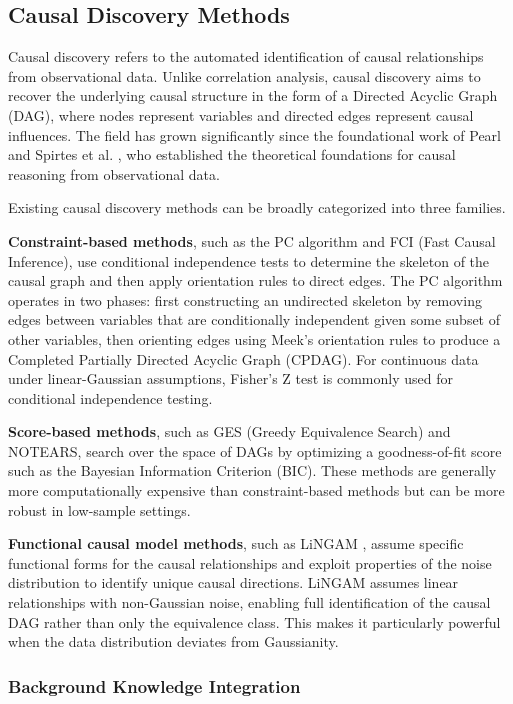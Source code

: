 \documentclass[a4paper,11pt,oneside]{article}
\begin{document}
\subsection{Causal Discovery Methods}

Causal discovery refers to the automated identification of causal relationships from observational data. Unlike correlation analysis, causal discovery aims to recover the underlying causal structure in the form of a Directed Acyclic Graph (DAG), where nodes represent variables and directed edges represent causal influences. The field has grown significantly since the foundational work of Pearl \cite{pearl2000} and Spirtes et al. \cite{spirtes2000}, who established the theoretical foundations for causal reasoning from observational data.

Existing causal discovery methods can be broadly categorized into three families.

\textbf{Constraint-based methods}, such as the PC algorithm \cite{spirtes2000} and FCI (Fast Causal Inference), use conditional independence tests to determine the skeleton of the causal graph and then apply orientation rules to direct edges. The PC algorithm operates in two phases: first constructing an undirected skeleton by removing edges between variables that are conditionally independent given some subset of other variables, then orienting edges using Meek's orientation rules to produce a Completed Partially Directed Acyclic Graph (CPDAG). For continuous data under linear-Gaussian assumptions, Fisher's Z test is commonly used for conditional independence testing.

\textbf{Score-based methods}, such as GES (Greedy Equivalence Search) \cite{hauser2012} and NOTEARS, search over the space of DAGs by optimizing a goodness-of-fit score such as the Bayesian Information Criterion (BIC). These methods are generally more computationally expensive than constraint-based methods but can be more robust in low-sample settings.

\textbf{Functional causal model methods}, such as LiNGAM \cite{shimizu2006}, assume specific functional forms for the causal relationships and exploit properties of the noise distribution to identify unique causal directions. LiNGAM assumes linear relationships with non-Gaussian noise, enabling full identification of the causal DAG rather than only the equivalence class. This makes it particularly powerful when the data distribution deviates from Gaussianity.

\subsubsection{Background Knowledge Integration}
\end{document}

